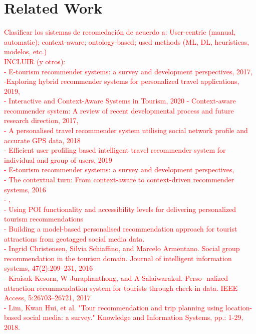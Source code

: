\section{Related Work} \label{section:related-work}

\textcolor{red}{Clasificar los sistemas de recomedación de acuerdo a: User-centric (manual, automatic); context-aware; ontology-based; used methods (ML, DL, heurísticas, modelos, etc.)\\
INCLUIR (y otros):\\
- E-tourism recommender systems: a survey and development perspectives, 2017, \cite{artemenko2017tourism}\\
-Exploring hybrid recommender systems for personalized travel applications, 2019, \cite{logesh2019exploring}\\
- Interactive and Context-Aware Systems in Tourism, 2020
- Context-aware recommender system: A review of recent developmental process and future research direction, 2017,\\ 
- A personalised travel recommender system utilising social network profile and accurate GPS data, 2018\\
- Efficient user profiling based intelligent travel recommender system for individual and group of users, 2019\\
- E-tourism recommender systems: a survey and development perspectives,\\
- The contextual turn: From context-aware to context-driven recommender systems, 2016\\
- \cite{adomavicius2011context,rajaonarivo2019recommendation},\\
- Using POI functionality and accessibility levels for delivering personalized tourism recommendations\\
- Building a model-based personalised recommendation approach
for tourist attractions from geotagged social media data.\\
- Ingrid Christensen, Silvia Schiaffino, and Marcelo Armentano.
Social group recommendation in the tourism domain. Journal
of intelligent information systems, 47(2):209–231, 2016\\
- Kraisak Kesorn, W Juraphanthong, and A Salaiwarakul. Perso-
nalized attraction recommendation system for tourists through
check-in data. IEEE Access, 5:26703–26721, 2017\\
- Lim, Kwan Hui, et al. "Tour recommendation and trip planning using location-based social media: a survey."
Knowledge and Information Systems, pp.: 1-29, 2018.
}

